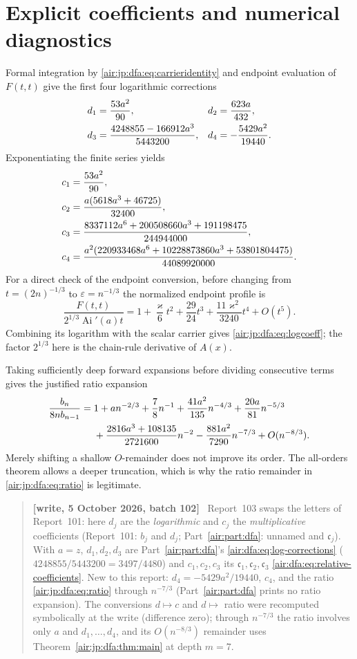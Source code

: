 \documentclass[11pt,letterpaper]{article}
\numberwithin{equation}{section}
\theoremstyle{remark}
\newcommand{\Ai}{\operatorname{Ai}}
\newcommand{\eps}{\varepsilon}
\newenvironment{writenotejp}{\par\smallskip\begin{quote}\small\textbf{[write, 5 October 2026, batch 102]}\ }{\end{quote}\smallskip}
\begin{document}
\section{Explicit coefficients and numerical diagnostics}\label{air:jp:dfa:sec:coefficients}
Formal integration by \eqref{air:jp:dfa:eq:carrieridentity} and endpoint evaluation of $F(t,t)$ give the first four logarithmic corrections
\begin{align}
 d_1&=\frac{53a^2}{90},&d_2&=\frac{623a}{432},\notag\\
 d_3&=\frac{4248855-166912a^3}{5443200},&
 d_4&=-\frac{5429a^2}{19440}.\label{air:jp:dfa:eq:logcoeff}
\end{align}
Exponentiating the finite series yields
\begin{align}
 c_1&=\frac{53a^2}{90},\notag\\
 c_2&=\frac{a(5618a^3+46725)}{32400},\notag\\
 c_3&=\frac{8337112a^6+200508660a^3+191198475}{244944000},\label{air:jp:dfa:eq:coefficients}\\
 c_4&=\frac{a^2(220933468a^6+10228873860a^3+53801804475)}{44089920000}.\notag
\end{align}
For a direct check of the endpoint conversion, before changing from $t=(2n)^{-1/3}$ to $\eps=n^{-1/3}$ the normalized endpoint profile is
\[
 \frac{F(t,t)}{2^{1/3}\Ai'(a)t}
 =1+\frac{\varkappa}{6}t^2+\frac{29}{24}t^3+
 \frac{11\varkappa^2}{3240}t^4+O(t^5).
\]
Combining its logarithm with the scalar carrier gives \eqref{air:jp:dfa:eq:logcoeff}; the factor $2^{1/3}$ here is the chain-rule derivative of $A(x)$.

Taking sufficiently deep forward expansions before dividing consecutive terms gives the justified ratio expansion
\begin{align}
 \frac{b_n}{8n b_{n-1}}
 ={}&1+an^{-2/3}+\frac78n^{-1}+\frac{41a^2}{135}n^{-4/3}
 +\frac{20a}{81}n^{-5/3}\notag\\
 &+\frac{2816a^3+108135}{2721600}n^{-2}
 -\frac{881a^2}{7290}n^{-7/3}+O(n^{-8/3}).\label{air:jp:dfa:eq:ratio}
\end{align}
Merely shifting a shallow $O$-remainder does not improve its order. The all-orders theorem allows a deeper truncation, which is why the ratio remainder in \eqref{air:jp:dfa:eq:ratio} is legitimate.
\begin{writenotejp}
Report~103 swaps the letters of Report~101: here $d_j$ are the \emph{logarithmic} and $c_j$ the \emph{multiplicative} coefficients (Report~101: $b_j$ and $d_j$; Part~\ref{air:part:dfa}: unnamed and $\mathfrak c_j$). With $a=z$, $d_1,d_2,d_3$ are Part~\ref{air:part:dfa}'s \eqref{air:dfa:eq:log-corrections} ($4248855/5443200=3497/4480$) and $c_1,c_2,c_3$ its $\mathfrak c_1,\mathfrak c_2,\mathfrak c_3$ \eqref{air:dfa:eq:relative-coefficients}. New to this report: $d_4=-5429a^2/19440$, $c_4$, and the ratio \eqref{air:jp:dfa:eq:ratio} through $n^{-7/3}$ (Part~\ref{air:part:dfa} prints no ratio expansion). The conversions $d\mapsto c$ and $d\mapsto$ ratio were recomputed symbolically at the write (difference zero); through $n^{-7/3}$ the ratio involves only $a$ and $d_1,\ldots,d_4$, and its $O(n^{-8/3})$ remainder uses Theorem~\ref{air:jp:dfa:thm:main} at depth $m=7$.
\end{writenotejp}
\end{document}
